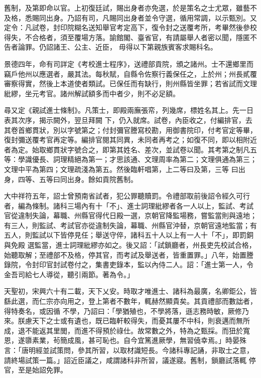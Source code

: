 \begin{pinyinscope}
 舊制，及第即命以官。上初復廷試，賜出身者亦免選，於是策名之士尤眾，雖藝不及格，悉賜同出身。乃詔有司，凡賜同出身者並令守選，循用常調，以示甄別。又定令：凡試卷，封印院糊名送知舉官考定高下，復令封之送覆考所，考畢然後參校得失，不合格者，須至覆場方落。諭館閣、臺省官，有請屬舉人者密以聞，隱匿不告者論罪。仍詔諸王、公主、近臣，
 毋得以下第親族賓客求賜科名。



 景德四年，命有司詳定《考校進士程序》，送禮部貢院，頒之諸州。士不還鄉里而竊戶他州以應選者，嚴其法。每秋賦，自縣令佐察行義保任之，上於州；州長貳覆審察得實，然後上本道使者類試。已保任而有缺行，則州縣皆坐罪；若省試而文理紕繆，坐元考官。諸州解試額多而中者少，則不必足額。



 尋又定《親試進士條制》。凡策士，即殿兩廡張帟，列幾席，標姓名其上。先一日表其次序，揭示闕外，翌旦拜闕
 下，仍入就席。試卷，內臣收之，付編排官，去其卷首鄉貫狀，別以字號第之；付封彌官謄寫校勘，用御書院印，付考官定等畢，復封彌送覆考官再定等。編排官閱其同異，未同者再考之；如復不同，即以相附近者為定。始取鄉貫狀字號合之，即第其姓名、差次，並試卷以聞。其考第之制凡五等：學識優長、詞理精絕為第一；才思該通、文理周率為第二；文理俱通為第三；文理中平為第四；文理疏淺為第五。然後臨軒唱第，上二等曰及第，三等
 曰出身，四等、五等曰同出身。餘如貢院舊制。



 大中祥符五年，詔士曾預南省試者，犯公罪聽贖罰。令禮部取前後詔令經久可行者，編為條制。諸科三場內有十「不」、進士詞理紕繆者各一人以上，監試、考試官從違制失論，幕職、州縣官得代日殿一選，京朝官降監場務，嘗監當則與遠地；有三人，則監試、考試官亦從違制失論，幕職、州縣官沖替，京朝官遠地監當；有五人，則監試以下皆停見任；舉送守倅，諸科五十人以上有一人十「不」，即罰銅與免殿
 選監當，進士詞理紕繆亦如之。後又詔：「試鎖廳者，州長吏先校試合格，始聽取解；至禮部不及格，停其官，而考試及舉送者，皆重置罪。」八年，始置謄錄院，令封印官封試卷付之，集書吏錄本，監以內侍二人。詔：「進士第一人，令金吾司給七人導從，聽引兩節。著為令。」



 天聖初，宋興六十有二載，天下乂安。時取才唯進士、諸科為最廣，名卿鉅公，皆繇此選，而仁宗亦向用之，登上第者不數年，輒赫然顯貴矣。其貢禮部而數詘者，得特奏名，或因循
 不學，乃詔曰：「學猶殖也，不學將落，遜志務時敏，厥修乃來。朕慮天下之士或有遺也，既已臨軒較得失，而憂其屢不中科，則衰邁而無所成，退不能返其里閭，而進不得預於祿仕。故常數之外，特為之甄採。而狃於寬恩，遂隳素業，茍簡成風，甚可恥也。自今宜篤進厥學，無習僥幸焉。」時晏殊言：「唐明經並試策問，參其所習，以取材識短長。今諸科專記誦，非取士之意，請終場試策一篇。」詔近臣議之，咸謂諸科非所習，議遂寢。舊制，鎖廳試落輒
 停官，至是始詔免罪。




\end{pinyinscope}
